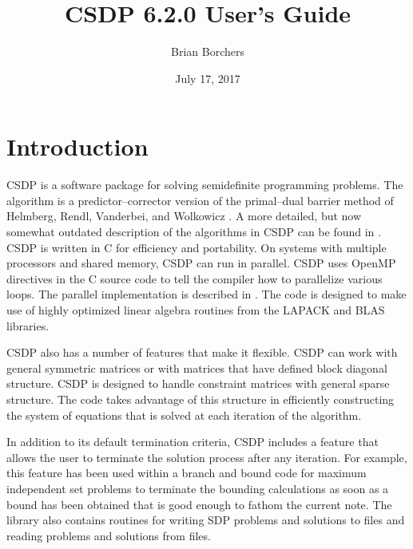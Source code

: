 \documentclass{article}
\begin{document}
%
%
%
%

\newcommand{\elprod}{\circ}

\title{CSDP 6.2.0 User's Guide}
\date{July 17, 2017}
\author{Brian Borchers}
\maketitle
\section*{Introduction}
CSDP is a software package for solving semidefinite programming
problems.  The algorithm is a predictor--corrector version of the
primal--dual barrier method of Helmberg, Rendl, Vanderbei, and
Wolkowicz \cite{HelmbergC:Anims}.  A more detailed, but now somewhat
outdated description of the algorithms in CSDP can be found in
\cite{BorchersB:CSDCls}.  CSDP is written in C for efficiency and
portability.  On systems with multiple processors and shared memory,
CSDP can run in parallel.  CSDP uses OpenMP directives in the C source
code to tell the compiler how to parallelize various loops.  The
parallel implementation is described in
\cite{borchers2007implementation}.  The code is designed to make use
of highly optimized linear algebra routines from the LAPACK and BLAS
libraries.

CSDP also has a number of features that make it flexible.  CSDP
can work with general symmetric matrices or with matrices that have
defined block diagonal structure.  CSDP is designed to handle
constraint matrices with general sparse structure.  The code takes
advantage of this structure in efficiently constructing the system of
equations that is solved at each iteration of the algorithm.  

In addition to its default termination criteria, CSDP includes a
feature that allows the user to terminate the solution process after
any iteration.  For example, this feature has been used within a
branch and bound code for maximum independent set problems to
terminate the bounding calculations as soon as a bound has been
obtained that is good enough to fathom the current note.  The library
also contains routines for writing SDP problems and solutions to files
and reading problems and solutions from files.
\end{document}
